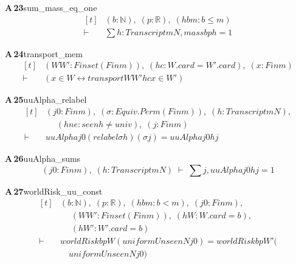 \documentclass[conference]{IEEEtran}
\theoremstyle{definition}
\newcommand{\lean}[1]{\textsf{\footnotesize #1}}
\begin{document}
\noindent\textbf{A\,23}\quad\lean{sum\_mass\_eq\_one}
{\footnotesize\[ \begin{aligned}[t]
&(\mathit{b} : \mathbb{N} ),\; (\mathit{p} : \mathbb{R} ),\; (\mathit{hbm} : \mathit{b} \leq \mathit{m})\\
\vdash\;&\textstyle\sum \mathit{h} : \mathit{Transcript} \mathit{m} \mathit{N}, \mathit{mass} \mathit{b} \mathit{p} \mathit{h} = 1
\end{aligned} \]}

\noindent\textbf{A\,24}\quad\lean{transport\_mem}
{\footnotesize\[ \begin{aligned}[t]
&(\mathit{W} \mathit{W'} : \mathit{Finset} (\mathit{Fin} \mathit{m})),\; (\mathit{hc} : \mathit{W}.\mathit{card} = \mathit{W'}.\mathit{card}),\; (\mathit{x} : \mathit{Fin} \mathit{m})\\
\vdash\;&(\mathit{x} \in \mathit{W} \leftrightarrow \mathit{transport} \mathit{W} \mathit{W'} \mathit{hc} \mathit{x} \in \mathit{W'})
\end{aligned} \]}

\noindent\textbf{A\,25}\quad\lean{uuAlpha\_relabel}
{\footnotesize\[ \begin{aligned}[t]
&(\mathit{j0} : \mathit{Fin} \mathit{m}),\; (\sigma : \mathit{Equiv}.\mathit{Perm} (\mathit{Fin} \mathit{m})),\; (\mathit{h} : \mathit{Transcript} \mathit{m} \mathit{N}),\\
&\quad \; (\mathit{hne} : \mathit{seen} \mathit{h} \neq \mathit{univ}),\; (\mathit{j} : \mathit{Fin} \mathit{m})\\
\vdash\;&\mathit{uuAlpha} \mathit{j0} (\mathit{relabel} \sigma \mathit{h}) (\sigma \mathit{j}) = \mathit{uuAlpha} \mathit{j0} \mathit{h} \mathit{j}
\end{aligned} \]}

\noindent\textbf{A\,26}\quad\lean{uuAlpha\_sums}
{\footnotesize\[ (\mathit{j0} : \mathit{Fin} \mathit{m}),\; (\mathit{h} : \mathit{Transcript} \mathit{m} \mathit{N}) \;\vdash\; \textstyle\sum \mathit{j}, \mathit{uuAlpha} \mathit{j0} \mathit{h} \mathit{j} = 1 \]}

\noindent\textbf{A\,27}\quad\lean{worldRisk\_uu\_const}
{\footnotesize\[ \begin{aligned}[t]
&(\mathit{b} : \mathbb{N} ),\; (\mathit{p} : \mathbb{R} ),\; (\mathit{hbm} : \mathit{b} < \mathit{m}),\; (\mathit{j0} : \mathit{Fin} \mathit{m}),\\
&\quad \; (\mathit{W} \mathit{W'} : \mathit{Finset} (\mathit{Fin} \mathit{m})),\; (\mathit{hW} : \mathit{W}.\mathit{card} = \mathit{b}),\\
&\quad \; (\mathit{hW'} : \mathit{W'}.\mathit{card} = \mathit{b})\\
\vdash\;&\mathit{worldRisk} \mathit{b} \mathit{p} \mathit{W} (\mathit{uniformUnseen} \mathit{N} \mathit{j0}) = \mathit{worldRisk} \mathit{b} \mathit{p} \mathit{W'} (\\
&\quad \mathit{uniformUnseen} \mathit{N} \mathit{j0})
\end{aligned} \]}
\end{document}
